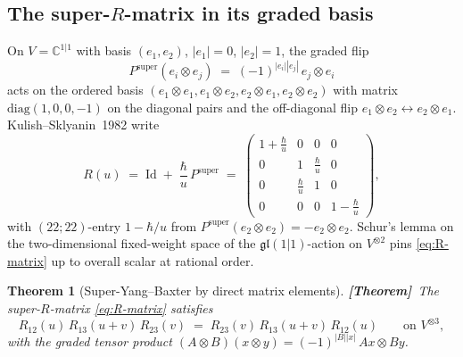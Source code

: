 \documentclass[11pt]{amsart}
\newtheorem{theorem}{Theorem}[section]
\theoremstyle{definition}
\providecommand{\bC}{\mathbb{C}}
\providecommand{\fgl}{\mathfrak{gl}}
\providecommand{\ClaimStatusTheorem}{\textbf{\textsf{[Theorem]}}}
\begin{document}
\subsection*{The super-$R$-matrix in its graded basis}
On $V = \bC^{1|1}$ with basis $(e_1, e_2)$, $|e_1| = 0$, $|e_2| = 1$, the
graded flip
\[
  P^{\mathrm{super}}(e_i \otimes e_j)
  \;=\; (-1)^{|e_i||e_j|}\, e_j \otimes e_i
\]
acts on the ordered basis $(e_1 \otimes e_1, e_1 \otimes e_2, e_2 \otimes e_1,
e_2 \otimes e_2)$ with matrix $\mathrm{diag}(1, 0, 0, -1)$ on the diagonal
pairs and the off-diagonal flip $e_1 \otimes e_2 \leftrightarrow e_2
\otimes e_1$. Kulish--Sklyanin~1982 write
\begin{equation}\label{eq:R-matrix}
  R(u) \;=\; \mathrm{Id} \;+\; \frac{\hbar}{u}\, P^{\mathrm{super}}
  \;=\;
  \begin{pmatrix}
    1 + \tfrac{\hbar}{u} & 0 & 0 & 0 \\
    0 & 1 & \tfrac{\hbar}{u} & 0 \\
    0 & \tfrac{\hbar}{u} & 1 & 0 \\
    0 & 0 & 0 & 1 - \tfrac{\hbar}{u}
  \end{pmatrix},
\end{equation}
with $(22; 22)$-entry $1 - \hbar/u$ from
$P^{\mathrm{super}}(e_2 \otimes e_2) = -e_2 \otimes e_2$. Schur's lemma on
the two-dimensional fixed-weight space of the $\fgl(1|1)$-action on
$V^{\otimes 2}$ pins \eqref{eq:R-matrix} up to overall scalar at rational
order.

\begin{theorem}[Super-Yang--Baxter by direct matrix elements]
\label{thm:rtt-super-ybe-direct}
\ClaimStatusTheorem\
The super-$R$-matrix \eqref{eq:R-matrix} satisfies
\[
  R_{12}(u)\, R_{13}(u+v)\, R_{23}(v)
  \;=\;
  R_{23}(v)\, R_{13}(u+v)\, R_{12}(u)
  \qquad\text{on }V^{\otimes 3},
\]
with the graded tensor product $(A \otimes B)(x \otimes y) =
(-1)^{|B||x|}\, Ax \otimes By$.
\end{theorem}
\end{document}

